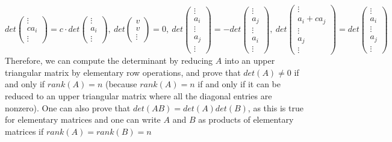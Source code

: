 \documentclass[11pt,a4paper]{report}
\theoremstyle{theoremdd}
\theoremstyle{claims1}
\theoremstyle{proofs1}
\begin{document}
\[
det\begin{pmatrix}\vdots \\ ca_i \\ \vdots\end{pmatrix}
= c\cdot det\begin{pmatrix}\vdots \\ a_i \\ \vdots\end{pmatrix}, \ 
det\begin{pmatrix}v \\ v \\ \vdots\end{pmatrix} = 0, \ 
det\begin{pmatrix}\vdots \\ a_i \\ \vdots \\ a_j \\ \vdots \end{pmatrix} = 
-det\begin{pmatrix}\vdots \\ a_j \\ \vdots \\ a_i \\ \vdots \end{pmatrix}, \ 
det\begin{pmatrix}\vdots \\ a_i + ca_j \\ \vdots \\ a_j \\ \vdots \end{pmatrix} = det\begin{pmatrix}\vdots \\ a_i \\ \vdots \\ a_j \\ \vdots \end{pmatrix}
\]
Therefore, we can compute the determinant by reducing $A$ into an upper triangular matrix by elementary row operations, and prove that $det(A)\ne 0$ if and only if $rank(A)=n$ (because $rank(A)=n$ if and only if it can be reduced to an upper triangular matrix where all the diagonal entries are nonzero).
\newline\newline One can also prove that $det(AB)=det(A)det(B)$, as this is true for elementary matrices and one can write $A$ and $B$ as products of elementary matrices if $rank(A)=rank(B)=n$
\end{document}
